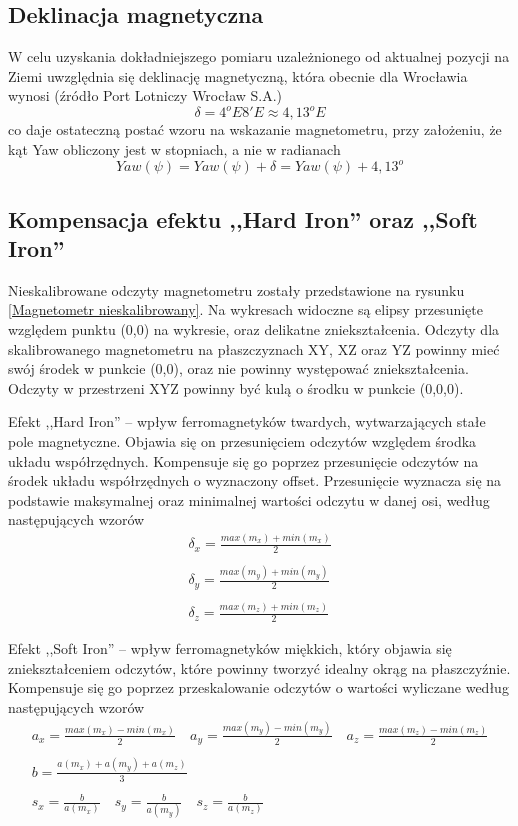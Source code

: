 \subsection{Deklinacja magnetyczna}
W celu uzyskania dokładniejszego pomiaru uzależnionego od aktualnej pozycji na Ziemi uwzględnia się deklinację magnetyczną, która obecnie dla Wrocławia wynosi (źródło Port Lotniczy Wrocław S.A.)
$$
    \delta = 4^{o}E8'E \approx 4,13^{o}E
$$
co daje ostateczną postać wzoru na wskazanie magnetometru, przy założeniu, że kąt Yaw obliczony jest w stopniach, a nie w radianach
$$
   Yaw(\psi) = Yaw(\psi) + \delta = Yaw(\psi) + 4,13^o 
$$

\subsection{Kompensacja efektu ,,Hard Iron'' oraz ,,Soft Iron''}

Nieskalibrowane odczyty magnetometru zostały przedstawione na rysunku \ref{Magnetometr nieskalibrowany}. Na wykresach widoczne są elipsy przesunięte względem punktu (0,0) na wykresie, oraz delikatne zniekształcenia. Odczyty dla skalibrowanego magnetometru na płaszczyznach XY, XZ oraz YZ powinny mieć swój środek w punkcie (0,0), oraz nie powinny występować zniekształcenia. Odczyty w przestrzeni XYZ powinny być kulą o środku w punkcie (0,0,0).

Efekt ,,Hard Iron'' -- wpływ ferromagnetyków twardych, wytwarzających stałe pole magnetyczne. Objawia się on przesunięciem odczytów względem środka układu współrzędnych. Kompensuje się go poprzez przesunięcie odczytów na środek układu współrzędnych o wyznaczony offset. Przesunięcie wyznacza się na podstawie maksymalnej oraz minimalnej wartości odczytu w danej osi, według następujących wzorów
$$
    \begin{array}{c}
        \delta_x = \frac{max(m_x) + min(m_x)}{2} \\ \\
        \delta_y = \frac{max(m_y) + min(m_y)}{2} \\ \\
        \delta_z = \frac{max(m_z) + min(m_z)}{2}
    \end{array}
$$

Efekt ,,Soft Iron'' -- wpływ ferromagnetyków miękkich, który objawia się zniekształceniem odczytów, które powinny tworzyć idealny okrąg na płaszczyźnie. Kompensuje się go poprzez przeskalowanie odczytów o wartości wyliczane według następujących wzorów
$$
    \begin{array}{c}
        a_x = \frac{max(m_x) - min(m_x)}{2}
        \quad
        a_y = \frac{max(m_y) - min(m_y)}{2}
        \quad
        a_z = \frac{max(m_z) - min(m_z)}{2} \\ \\
        b = \frac{a(m_x) + a(m_y) + a(m_z)}{3} \\ \\
        s_x = \frac{b}{a(m_x)}
        \quad
        s_y = \frac{b}{a(m_y)}
        \quad
        s_z = \frac{b}{a(m_z)} 
    \end{array}
$$

